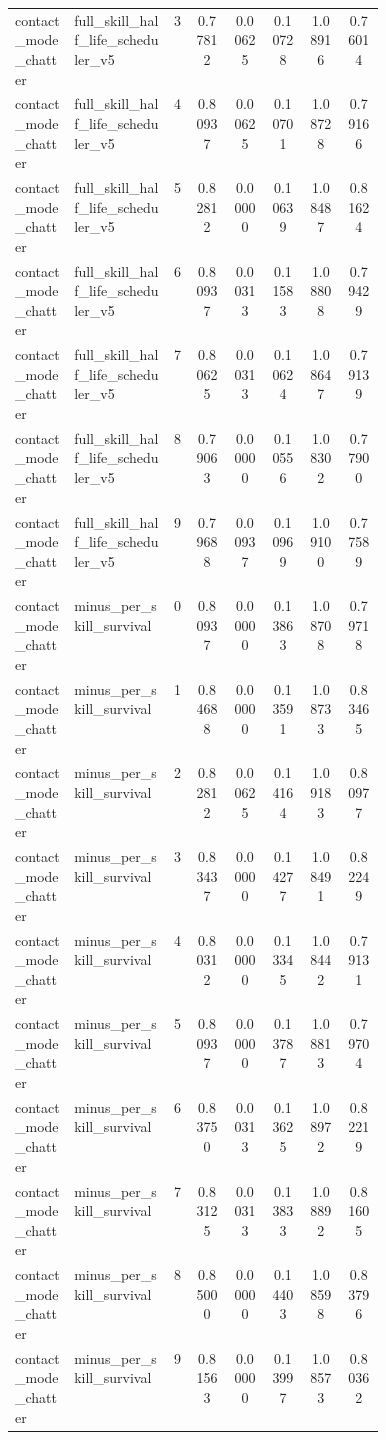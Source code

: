\documentclass{article}
\begin{document}
\begin{center}
\begin{longtable}{p{0.16\linewidth}p{0.27\linewidth}cccccc}
contact\_mode\_chatter & full\_skill\_half\_life\_scheduler\_v5 & 3 & 0.77812 & 0.00625 & 0.10728 & 1.08916 & 0.76014\\
contact\_mode\_chatter & full\_skill\_half\_life\_scheduler\_v5 & 4 & 0.80937 & 0.00625 & 0.10701 & 1.08728 & 0.79166\\
contact\_mode\_chatter & full\_skill\_half\_life\_scheduler\_v5 & 5 & 0.82812 & 0.00000 & 0.10639 & 1.08487 & 0.81624\\
contact\_mode\_chatter & full\_skill\_half\_life\_scheduler\_v5 & 6 & 0.80937 & 0.00313 & 0.11583 & 1.08808 & 0.79429\\
contact\_mode\_chatter & full\_skill\_half\_life\_scheduler\_v5 & 7 & 0.80625 & 0.00313 & 0.10624 & 1.08647 & 0.79139\\
contact\_mode\_chatter & full\_skill\_half\_life\_scheduler\_v5 & 8 & 0.79063 & 0.00000 & 0.10556 & 1.08302 & 0.77900\\
contact\_mode\_chatter & full\_skill\_half\_life\_scheduler\_v5 & 9 & 0.79688 & 0.00937 & 0.10969 & 1.09100 & 0.77589\\
contact\_mode\_chatter & minus\_per\_skill\_survival & 0 & 0.80937 & 0.00000 & 0.13863 & 1.08708 & 0.79718\\
contact\_mode\_chatter & minus\_per\_skill\_survival & 1 & 0.84688 & 0.00000 & 0.13591 & 1.08733 & 0.83465\\
contact\_mode\_chatter & minus\_per\_skill\_survival & 2 & 0.82812 & 0.00625 & 0.14164 & 1.09183 & 0.80977\\
contact\_mode\_chatter & minus\_per\_skill\_survival & 3 & 0.83437 & 0.00000 & 0.14277 & 1.08491 & 0.82249\\
contact\_mode\_chatter & minus\_per\_skill\_survival & 4 & 0.80312 & 0.00000 & 0.13345 & 1.08442 & 0.79131\\
contact\_mode\_chatter & minus\_per\_skill\_survival & 5 & 0.80937 & 0.00000 & 0.13787 & 1.08813 & 0.79704\\
contact\_mode\_chatter & minus\_per\_skill\_survival & 6 & 0.83750 & 0.00313 & 0.13625 & 1.08972 & 0.82219\\
contact\_mode\_chatter & minus\_per\_skill\_survival & 7 & 0.83125 & 0.00313 & 0.13833 & 1.08892 & 0.81605\\
contact\_mode\_chatter & minus\_per\_skill\_survival & 8 & 0.85000 & 0.00000 & 0.14403 & 1.08598 & 0.83796\\
contact\_mode\_chatter & minus\_per\_skill\_survival & 9 & 0.81563 & 0.00000 & 0.13997 & 1.08573 & 0.80362\\

\end{longtable}
\end{center}
\end{document}
